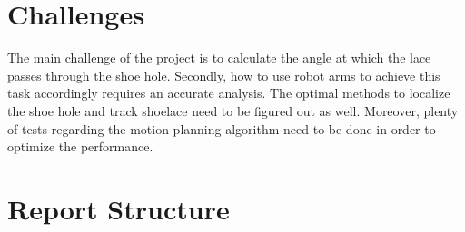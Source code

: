 \section{Challenges}
The main challenge of the project is to calculate the angle at which the lace passes through the shoe hole. Secondly, how to use robot arms to achieve this task accordingly requires an accurate analysis. The optimal methods to localize the shoe hole and track shoelace need to be figured out as well. Moreover, plenty of tests regarding the motion planning algorithm need to be done in order to optimize the performance.

\section{Report Structure}
